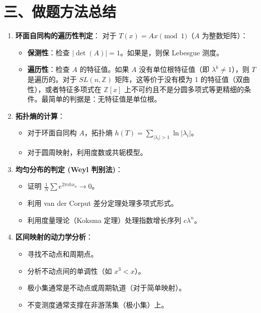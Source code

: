 \documentclass[a4paper,12pt]{article}
\begin{document}
\section*{三、做题方法总结}

\begin{enumerate}
    \item \textbf{环面自同构的遍历性判定}：
    对于 $T(x) = Ax \pmod 1$（$A$ 为整数矩阵）：
    \begin{itemize}
        \item \textbf{保测性}：检查 $|\det(A)| = 1$。如果是，则保 Lebesgue 测度。
        \item \textbf{遍历性}：检查 $A$ 的特征值。如果 $A$ 没有单位根特征值（即 $\lambda^k \neq 1$），则 $T$ 是遍历的。对于 $SL(n, \mathbb{Z})$ 矩阵，这等价于没有模为 1 的特征值（双曲性），或者特征多项式在 $\mathbb{Z}[x]$ 上不可约且不是分圆多项式等更精细的条件。最简单的判据是：无特征值是单位根。
    \end{itemize}

    \item \textbf{拓扑熵的计算}：
    \begin{itemize}
        \item 对于环面自同构 $A$，拓扑熵 $h(T) = \sum_{|\lambda_i|>1} \ln |\lambda_i|$。
        \item 对于圆周映射，利用度数或共轭模型。
    \end{itemize}

    \item \textbf{均匀分布的判定 (Weyl 判别法)}：
    \begin{itemize}
        \item 证明 $\frac{1}{N} \sum e^{2\pi i h x_n} \to 0$。
        \item 利用 van der Corput 差分定理处理多项式形式。
        \item 利用度量理论（Koksma 定理）处理指数增长序列 $c \lambda^n$。
    \end{itemize}

    \item \textbf{区间映射的动力学分析}：
    \begin{itemize}
        \item 寻找不动点和周期点。
        \item 分析不动点间的单调性（如 $x^3 < x$）。
        \item 极小集通常是不动点或周期轨道（对于简单映射）。
        \item 不变测度通常支撑在非游荡集（极小集）上。
    \end{itemize}
\end{enumerate}
\end{document}
